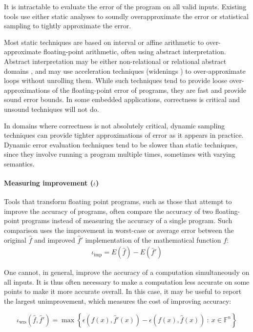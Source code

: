 \documentclass[main.tex]{subfiles}
\begin{document}
It is intractable to evaluate the error of the program on all valid inputs.
Existing tools use
  either static analyses to soundly overapproximate the error
  or statistical sampling to tightly approximate the error.

Most static techniques are based on interval or affine arithmetic
  to over-approximate floating-point arithmetic,
  often using abstract interpretation.
Abstract interpretation may be either non-relational \cite{Mar05}
  or relational abstract domains \cite{Cha100,GP11,AGW15},
  and may use acceleration techniques (widenings \cite{CC92})
  to over-approximate loops without unrolling them.
While such techniques tend to provide loose over-approximations
of the floating-point error of programs, they are fast and
provide sound error bounds. In some embedded applications,
correctness is critical and unsound techniques will not do.

In domains where correctness is not absolutely critical,
dynamic sampling techniques can provide tighter approximations of
error as it appears in practice. Dynamic error evaluation techniques
tend to be slower than static techniques, since they involve running a
program multiple times, sometimes with varying semantics.

\paragraph{Measuring improvement ($\iota$)}

Tools that transform floating point programs,
  such as those that attempt to improve the accuracy of programs,
  often compare the accuracy of two floating-point programs
  instead of measuring the accuracy of a single program.
Such comparison uses the improvement in worst-case or average error
  between the original $\hat f$ and improved $\hat f'$ implementation
  of the mathematical function $f$:
\begin{align*}
  \iota_{\text{imp}} = E(\hat{f}) - E(\hat{f}')
\end{align*}

One cannot, in general,
  improve the accuracy of a computation
  simultaneously on all inputs.
It is thus often necessary
  to make a computation less accurate on some points
  to make it more accurate overall.
In this case, it may be useful to report the largest unimprovement,
  which measures the cost of improving accuracy:

\begin{equation*}
  \iota_{\text{wrs}}(\hat{f},\hat{f}') = \max \left\{ \epsilon(f(x),\hat{f}'(x)) - \epsilon(f(x),\hat{f}(x))   
\ :\ x\in \mathbb{F}^n\right\}  
\end{equation*}
\end{document}

